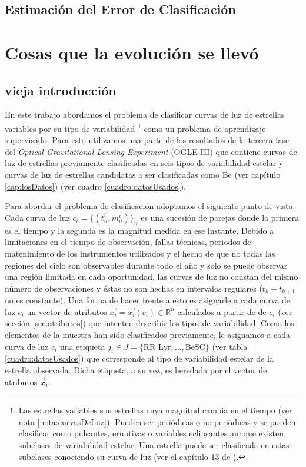 \documentclass[letterpaper,12pt]{book}
\begin{document}
\section{Estimación del Error de Clasificación}\label{sec:estimacionError}


\chapter{Cosas que la evolución se llevó}

\section{vieja introducción}
En este trabajo abordamos el problema de clasificar curvas de luz de estrellas variables por su tipo de variabilidad \footnote{Las estrellas variables son estrellas cuya magnitud cambia en el tiempo (ver nota \ref{nota:curvasDeLuz}). Pueden ser periódicas o no periódicas y se pueden clasificar como pulsantes, eruptivas o variables eclipsantes aunque existen subclases de variabilidad estelar. Una estrella puede ser clasificada en estas subclases conociendo su curva de luz (ver el capítulo 13 de \cite{karttunen_fundamental_2007}).} como un problema de aprendizaje supervisado. Para esto utilizamos una parte de los resultados de la tercera fase del \textit{Optical Gravitational Lensing Experiment} (OGLE III) que contiene curvas de luz  de estrellas previamente clasificadas en seis tipos de variabilidad estelar y curvas de luz de estrellas candidatas a ser clasificadas como Be (ver capítulo \ref{cap:losDatos}) (ver cuadro \ref{cuadro:datosUsados}). 


Para abordar el problema de clasificación adoptamos el siguiente punto de vista. Cada curva de luz $c_i = \{(t_{n}^{i}, m_{n}^{i})\}_{n}$ es una sucesión de parejas donde la primera es el tiempo y la segunda es la magnitud medida en ese instante.  Debido a limitaciones en el tiempo de observación, fallas técnicas, periodos de matenimiento de los instrumentos utilizados y el hecho de que no todas las regiones del cielo son observables durante todo el año y solo se puede observar una región limitada en cada oportunidad, las curvas de luz no constan del mismo número de observaciones y éstas no son hechas en intervalos regulares ($t_{k} - t_{k+1}$ no es constante). Una forma de hacer frente a esto es asignarle a cada curva de luz $c_i$ un vector de atributos $\vec{x_{i}} = \vec{x_{i}}(c_i)\in\mathbb{R}^{n}$ calculados a partir de de $c_i$ (ver sección \ref{sec:atributos}) que intenten describir los tipos de variabilidad. Como los elementos de la muestra han sido clasificados previamente, le asignamos a cada curva de luz $c_i$ una etiqueta $j_i\in J=\{\text{RR Lyr}, \dots, \text{BeSC}\}$ (ver tabla \ref{cuadro:datosUsados}) que corresponde al tipo de variabilidad estelar de la estrella observada.  Dicha etiqueta, a su vez, es heredada por el vector de atributos $\vec{x}_i$.
\end{document}
